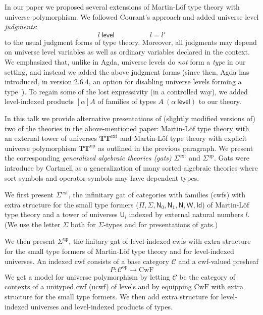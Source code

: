 \documentclass{easychair}
\newcommand{\Id}{\mathsf{Id}}
\newcommand{\level}{\mathsf{level}}
\newcommand{\op}{\mathrm{op}}
\newcommand{\N}{\mathsf{N}}
\def\U{\mathsf{U}}
\def\CwF{\mathrm{CwF}}
\def\C{\mathcal{C}}
\def\W{\mathsf{W}}
\def\Sigmaext{{\Sigma^\mathrm{ext}}}
\def\Sigmaint{{\Sigma^\mathrm{up}}}
\def\TText{{\mathbf{TT}^\mathrm{ext}}}
\def\TTint{{\mathbf{TT}^\mathrm{up}}}
\begin{document}
In our paper \cite{BezemCDE22} we proposed several extensions of Martin-Löf type theory with universe polymorphism. We followed Courant's approach \cite{Courant02} and added universe level {\em judgments}:
$$
l\ \level
\hspace{5em}
l = l'
$$
to the usual judgment forms of type theory. Moreover, all judgments may depend on universe level variables as well as ordinary variables declared in the context. We emphasized that, unlike in Agda, universe levels do {\em not} form a {\em type} in our setting, and instead we added the above judgment forms (since then, Agda has introduced, in version 2.6.4, an option for disabling universe levels forming a type~\cite{agda:leveluniv}).  To regain some of the lost expressivity (in a controlled way), we added level-indexed products $[\alpha]A$ of families of types $A\ (\alpha\ \level)$ to our theory.

In this talk we provide alternative presentations of (slightly modified versions of) two of the theories in the above-mentioned paper: Martin-Löf type theory with an external tower of universes $\TText$ and Martin-Löf type theory with explicit universe polymorphism $\TTint$ as outlined in the previous paragraph. We present the corresponding {\em generalized algebraic theories (gats)} $\Sigmaext$ and $\Sigmaint$. Gats were introduce by Cartmell \cite{cartmell:phd,cartmell:apal} as a generalization of many sorted algebraic theories where sort symbols and operator symbols may have dependent types. 


We first present $\Sigmaext$, the infinitary gat of categories with families (cwfs)  \cite{dybjer:torino} with extra structure for the small type formers ($\Pi, \Sigma, \N_0, \N_1, \N, \W, \Id$) of Martin-Löf type theory and a tower of universes $\U_l$ indexed by external natural numbers $l$. (We use the letter $\Sigma$ both for $\Sigma$-types and for presentations of gats.)

We then present $\Sigmaint$, the finitary gat of level-indexed cwfs with extra structure for the small type formers of Martin-Löf type theory and for level-indexed universes. An indexed cwf consists of a base category $\C$ and a cwf-valued presheaf
$$
P : \C^\op \to \CwF
$$
We get a model for universe polymorphism by letting $\C$ be the category of contexts of a unityped cwf (ucwf) of levels and by equipping $\CwF$ with extra structure for the small type formers. We then add extra structure for level-indexed universes and level-indexed products of types.
\end{document}
